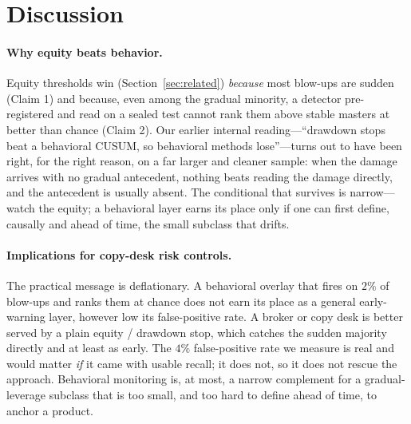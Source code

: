 \documentclass[11pt,a4paper]{article}
\begin{document}
\section{Discussion}
\label{sec:discussion}

\paragraph{Why equity beats behavior.}
Equity thresholds win (Section~\ref{sec:related}) \emph{because} most blow-ups are
sudden (Claim 1) and because, even among the gradual minority, a detector
pre-registered and read on a sealed test cannot rank them above stable masters at
better than chance (Claim 2). Our earlier internal reading---``drawdown stops beat a
behavioral CUSUM, so behavioral methods lose''---turns out to have been right, for
the right reason, on a far larger and cleaner sample: when the damage arrives with no
gradual antecedent, nothing beats reading the damage directly, and the antecedent is
usually absent. The conditional that survives is narrow---watch the equity; a
behavioral layer earns its place only if one can first define, causally and ahead of
time, the small subclass that drifts.

\paragraph{Implications for copy-desk risk controls.}
The practical message is deflationary. A behavioral overlay that fires on $2\%$ of
blow-ups and ranks them at chance does not earn its place as a general early-warning
layer, however low its false-positive rate. A broker or copy desk is better served
by a plain equity / drawdown stop, which catches the sudden majority directly and at
least as early. The $4\%$ false-positive rate we measure is real and would matter
\emph{if} it came with usable recall; it does not, so it does not rescue the
approach. Behavioral monitoring is, at most, a narrow complement for a
gradual-leverage subclass that is too small, and too hard to define ahead of time,
to anchor a product.
\end{document}
